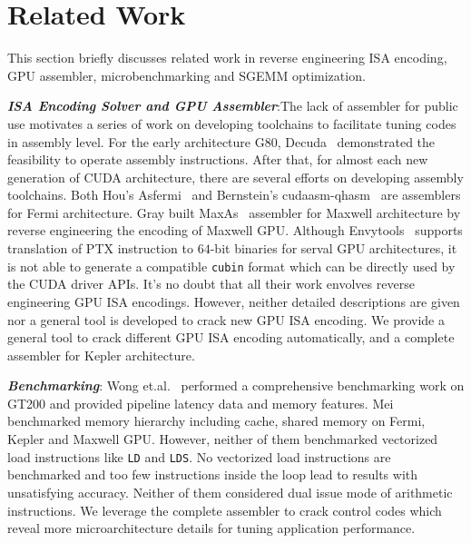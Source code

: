 \section{Related Work}
\label{sec:related}
This section briefly discusses related work in reverse engineering ISA encoding, GPU assembler, microbenchmarking and SGEMM optimization.

{\em {\bf ISA Encoding Solver and GPU Assembler}}:The lack of assembler for public use motivates a series of work on developing toolchains to facilitate tuning codes in 
assembly level. 
For the early architecture G80, Decuda~\cite{decuda} demonstrated the feasibility to operate
assembly instructions. After that, for almost each new generation of CUDA architecture, there are several 
efforts on developing assembly toolchains. Both Hou's Asfermi~\cite{asfermi} and Bernstein's 
cudaasm-qhasm~\cite{bernstein2012usable} are assemblers for Fermi architecture. Gray built MaxAs~\cite{maxas} assembler 
for Maxwell architecture by reverse engineering the encoding of Maxwell GPU. 
Although Envytools~\cite{envytools} supports translation of PTX instruction to $64$-bit binaries 
for serval GPU architectures, it is not able to generate a compatible {\tt cubin} format which can be directly used by 
the CUDA driver APIs. %
It's no doubt that all their work envolves reverse engineering GPU ISA
encodings. However, neither detailed descriptions are given nor a general tool is developed to crack
new GPU ISA encoding. We provide a general tool to crack different GPU ISA encoding
automatically, and a complete assembler for Kepler architecture.

{\em {\bf Benchmarking}}: Wong et.al.~\cite{wong} performed a 
comprehensive benchmarking work on GT200 and provided pipeline latency data and
memory features. Mei~\cite{mei} benchmarked memory hierarchy including cache, shared memory on Fermi, Kepler and Maxwell GPU.
However, neither of them benchmarked 
vectorized load instructions like {\tt LD} and {\tt LDS}. 
No vectorized load instructions are benchmarked and too few instructions inside the loop lead to results with unsatisfying accuracy.
Neither of them considered dual issue mode of 
arithmetic instructions. We leverage the complete assembler to crack control codes which reveal more 
microarchitecture details for tuning application performance.


